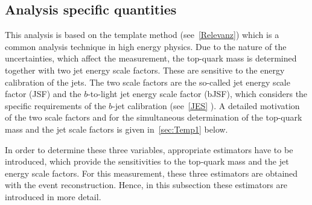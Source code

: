 \subsection{Analysis specific quantities}

This analysis is based on the template method (see~\cref{Relevanz}) which is a common analysis technique in high energy physics. Due to the nature of the uncertainties, which affect the measurement, the top-quark mass is determined together with two jet energy scale factors. These are sensitive to the energy calibration of the jets.  
The two scale factors are the so-called jet energy scale factor (JSF) and the  $b$-to-light jet energy scale factor (bJSF), which considers the specific requirements of the $b$-jet calibration (see~\cref{JES} ). 
 A detailed motivation of the two scale factors and  for the simultaneous determination of the top-quark mass and the jet scale factors is given in~\cref{sec:Temp1} below.
 
In order to determine these three variables, appropriate estimators have to be introduced, which provide the sensitivities to the  top-quark mass and the jet energy scale factors.
For this measurement, these three estimators are obtained with the event reconstruction. Hence,  in this subsection these estimators are introduced in more detail. 

